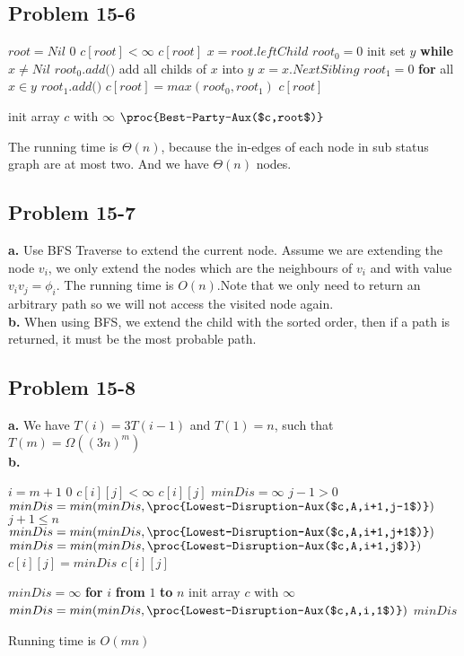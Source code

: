\documentclass[12pt]{article}
\theoremstyle{definition}
\theoremstyle{remark}
\begin{document}
\subsection*{Problem 15-6}
\begin{codebox}
\li \If $root=Nil$ \label{li:if}
\li \quad \Return $0$
\li \If $c[root]<\infty$ \label{li:if}
\li \quad \Return $c[root]$
\li $x=root.leftChild$
\li $root_0=0$
\li init set $y$
\li \textbf{while} $x\ne Nil$
\li \quad $root_0.add($$)$
\li \quad add all childs of $x$ into $y$
\li \quad $x=x.NextSibling$
\li $root_1=0$
\li \textbf{for} all $x\in y$
\li \quad $root_1.add($$)$
\li $c[root]=max(root_0,root_1)$
\li \Return $c[root]$
\end{codebox}
\begin{codebox}
\li init array $c$ with $\infty$
\li \Return $\proc{Best-Party-Aux($c,root$)}$
\end{codebox}
The running time is $\Theta(n)$, because the in-edges of each node in sub status graph are at most two. And we have $\Theta(n)$ nodes.
\subsection*{Problem 15-7}
\textbf{a.} Use BFS Traverse to extend the current node. Assume we are extending the node $v_i$, we only extend the nodes which are the neighbours of $v_i$ and with value $v_iv_j=\phi_i$.
The running time is $O(n)$.Note that we only need to return an arbitrary path so we will not access the visited node again. \\
\textbf{b.} When using BFS, we extend the child with the sorted order, then if a path is returned, it must be the most probable path.
\subsection*{Problem 15-8}
\textbf{a.} We have $T(i)=3T(i-1)$ and $T(1)=n$, such that $T(m)=\Omega((3n)^m)$\\
\textbf{b.}
\begin{codebox}
\li \If $i=m+1$ \label{li:if}
\li \quad \Return $0$
\li \If $c[i][j]<\infty$ \label{li:if}
\li \quad \Return $c[i][j]$
\li $minDis=\infty$
\li \If $j-1>0$ \label{li:if}
\li \quad $minDis=min(minDis,\proc{Lowest-Disruption-Aux($c,A,i+1,j-1$)})$
\li \If $j+1\le n$ \label{li:if}
\li \quad $minDis=min(minDis,\proc{Lowest-Disruption-Aux($c,A,i+1,j+1$)})$
\li $minDis=min(minDis,\proc{Lowest-Disruption-Aux($c,A,i+1,j$)})$
\li $c[i][j]=minDis$
\li \Return $c[i][j]$
\end{codebox}
\begin{codebox}
\li $minDis=\infty$
\li \textbf{for} $i$ \textbf{from} $1$ \textbf{to} $n$
\li \quad init array $c$ with $\infty$
\li \quad $minDis=min(minDis,\proc{Lowest-Disruption-Aux($c,A,i,1$)})$
\li \Return $minDis$
\end{codebox}
Running time is $O(mn)$
\end{document}
